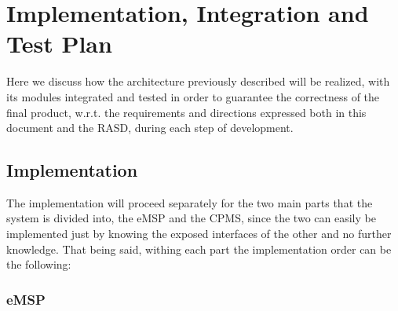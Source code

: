 \documentclass[11pt]{article}
\begin{document}
\newpage

\section{Implementation, Integration and Test Plan}

Here we discuss how the architecture previously described will be realized, with its modules integrated and tested in order to guarantee the correctness of the final product, w.r.t. the requirements and directions expressed both in this document and the RASD, during each step of development.

\subsection{Implementation}

The implementation will proceed separately for the two main parts that the system is divided into, the eMSP and the CPMS, since the two can easily be implemented just by knowing the exposed interfaces of the other and no further knowledge. That being said, withing each part the implementation order can be the following:

\subsubsection{eMSP}
\end{document}
